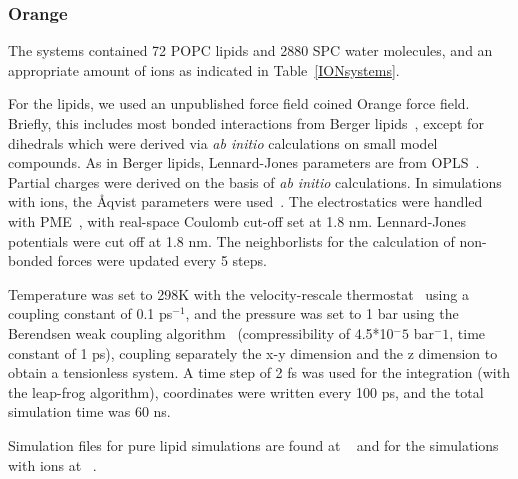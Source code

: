 \documentclass[pre,aps,floatfix,authordate1-4,twocolumn]{revtex4-1}
\begin{document}
\subsubsection{Orange}
The systems contained 72 POPC lipids and 2880 SPC water molecules, and an appropriate amount of ions as indicated in 
Table~\ref{IONsystems}.  

For the lipids, we used an unpublished force field coined Orange force field. 
Briefly, this includes most bonded interactions from Berger lipids~\cite{berger97}, 
except for dihedrals which were derived via \textit{ab initio} calculations on small model compounds. 
As in Berger lipids, Lennard-Jones parameters are from OPLS~\cite{jorgensen84,jorgensen86a,jorgensen86b,jorgensen88,briggs91}.
Partial charges were derived on the basis of \textit{ab initio} calculations. 
In simulations with ions, the Åqvist parameters were used~\cite{aqvist90}. 
The electrostatics were handled with PME~\cite{darden93,essman95}, with real-space Coulomb cut-off set at 1.8 nm. 
Lennard-Jones potentials were cut off at 1.8 nm. 
The neighborlists for the calculation of non-bonded forces were updated every 5 steps.

Temperature was set to 298K with the velocity-rescale thermostat~\cite{bussi07} using a coupling constant of 0.1 ps$^{-1}$, and the pressure was set to 1 bar using the Berendsen weak coupling algorithm~\cite{berendsen84} (compressibility of 4.5*10$^-5$ bar$^-1$, time constant of 1 ps), coupling separately the x-y dimension and the z dimension to obtain a tensionless system. 
A time step of 2 fs was used for the integration (with the leap-frog algorithm), coordinates were written every 100 ps, 
and the total simulation time was 60 ns. 

Simulation files for pure lipid simulations are found at ~\cite{orangePOPCfiles} and for the simulations with ions at ~\cite{orangePOPC140mMNaClfiles,orangePOPC510mMNaClfiles,orangePOPC510mMCaClfiles,orangePOPC1000mMNaClfiles}.
\end{document}
